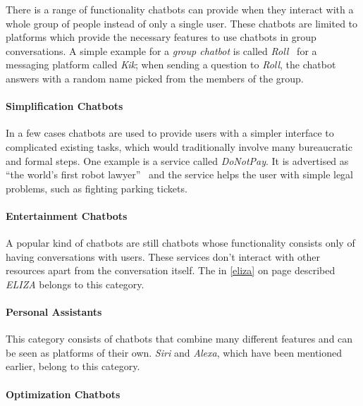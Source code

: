 There is a range of functionality chatbots can provide when they interact with a whole group of people instead of only a single user.
These chatbots are limited to platforms which provide the necessary features to use chatbots in group conversations.
A simple example for a \emph{group chatbot} is called \emph{Roll}~\cite{venturebeat} for a messaging platform called \emph{Kik};
when sending a question to \emph{Roll}, the chatbot answers with a random name picked from the members of the group.


\paragraph{Simplification Chatbots}

In a few cases chatbots are used to provide users with a simpler interface to complicated existing tasks, which would traditionally involve many bureaucratic and formal steps.
One example is a service called \emph{DoNotPay}.
It is advertised as ``the world's first robot lawyer''~\cite{oreilly} and the service helps the user with simple legal problems,
such as fighting parking tickets.


\paragraph{Entertainment Chatbots}

A popular kind of chatbots are still chatbots whose functionality consists only of having conversations with users.
These services don't interact with other resources apart from the conversation itself.
The in \ref{eliza} on page \pageref{eliza} described \emph{ELIZA} belongs to this category.


\paragraph{Personal Assistants}
\label{assistants}

This category consists of chatbots that combine many different features and can be seen as platforms of their own.
\emph{Siri} and \emph{Alexa}, which have been mentioned earlier, belong to this category.


\paragraph{Optimization Chatbots}

